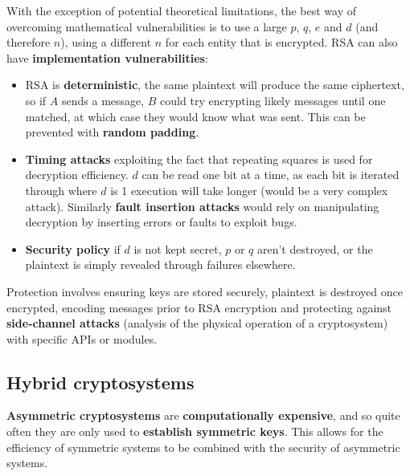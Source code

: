 \documentclass[final]{article}
\begin{document}
With the exception of potential theoretical limitations, the best way of overcoming mathematical vulnerabilities is to use a large $ p $, $ q $, $ e $ and $ d $ (and therefore $ n $), using a different $ n $ for each entity that is encrypted. RSA can also have \textbf{implementation vulnerabilities}:
\begin{itemize}
	\item RSA is \textbf{deterministic}, the same plaintext will produce the same ciphertext, so if $ A $ sends a message, $ B $ could try encrypting likely messages until one matched, at which case they would know what was sent. This can be prevented with \textbf{random padding}.
	\item \textbf{Timing attacks} exploiting the fact that repeating squares is used for decryption efficiency. $ d $ can be read one bit at a time, as each bit is iterated through where $ d $ is 1 execution will take longer (would be a very complex attack). Similarly \textbf{fault insertion attacks} would rely on manipulating decryption by inserting errors or faults to exploit bugs.
	\item \textbf{Security policy} if $ d $ is not kept secret, $ p $ or $ q $ aren't destroyed, or the plaintext is simply revealed through failures elsewhere.
\end{itemize}
Protection involves ensuring keys are stored securely, plaintext is destroyed once encrypted, encoding messages prior to RSA encryption and protecting against \textbf{side-channel attacks} (analysis of the physical operation of a cryptosystem) with specific APIs or modules.

\subsection{Hybrid cryptosystems}
\textbf{Asymmetric cryptosystems} are \textbf{computationally expensive}, and so quite often they are only used to \textbf{establish symmetric keys}. This allows for the efficiency of symmetric systems to be combined with the security of asymmetric systems.
\end{document}
